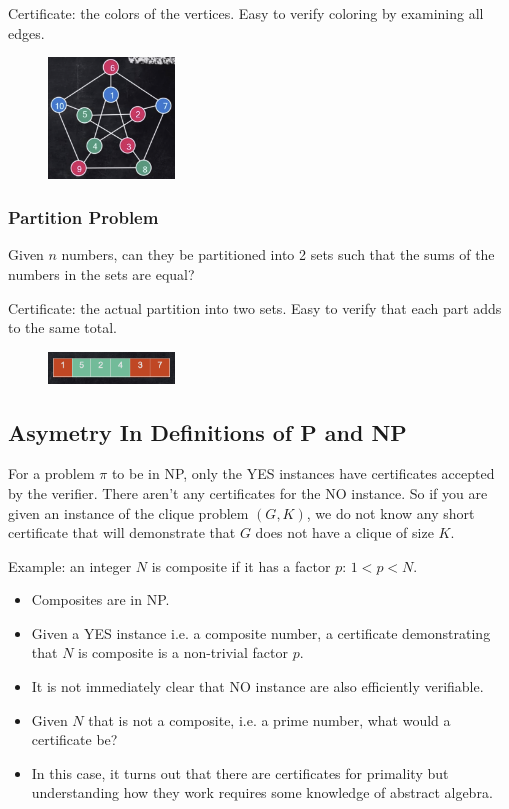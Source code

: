 Certificate: the colors of the vertices. Easy to verify coloring by examining all edges.

\begin{figure}[H]
	\centering
	\includegraphics[width=0.3\textwidth]{fig/3-color.png}
\end{figure}

\subsubsection{Partition Problem}
Given $n$ numbers, can they be partitioned into 2 sets such that the sums of the numbers in the sets are equal?

Certificate: the actual partition into two sets. Easy to verify that each part adds to the same total.

\begin{figure}[H]
	\centering
	\includegraphics[width=0.3\textwidth]{fig/partition.png}
\end{figure}

\subsection{Asymetry In Definitions of P and NP}
For a problem $\pi$ to be in NP, only the YES instances have certificates accepted by the verifier. There aren't any certificates for the NO instance. So if you are given an instance of the clique problem $(G, K)$, we do not know any short certificate that will demonstrate that $G$ does not have a clique of size $K$.

Example: an integer $N$ is composite if it has a factor $p$: $1 < p < N$.
\begin{itemize}
	\item Composites are in NP.
	\item Given a YES instance i.e. a composite number, a certificate demonstrating that $N$ is composite is a non-trivial factor $p$.
	\item It is not immediately clear that NO instance are also efficiently verifiable.
	\item Given $N$ that is not a composite, i.e. a prime number, what would a certificate be?
	\item In this case, it turns out that there are certificates for primality but understanding how they work requires some knowledge of abstract algebra.
\end{itemize}

